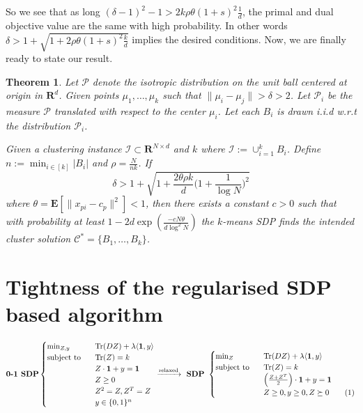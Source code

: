 \documentclass[12pt]{article}
\newcommand{\mc}{\mathcal}
\newcommand{\mb}{\mathbf}
\newcommand{\tr}{\text{Tr}}
\newcommand\numberthis{\addtocounter{equation}{1}\tag{\theequation}}
\newtheorem{theorem}{Theorem}
\begin{document}
So we see that as long $(\delta - 1)^2 - 1 > 2k\rho\theta (1+s)^2\frac{1}{d}$, the primal and dual objective value are the same with high probability. In other words $\delta > 1 + \sqrt{1+2\rho\theta(1+s)^2\frac{k}{d}}$ implies the desired conditions. Now, we are finally ready to state our result.

\begin{theorem}
\label{a-thm:SDPIsometric}
Let $\mc P$ denote the isotropic distribution on the unit ball centered at origin in $\mb R^d$. Given points $\mu_1, \ldots, \mu_k$ such that $\|\mu_i - \mu_j\| > \delta  > 2$. Let $\mc P_i$ be the measure $\mc P$ translated with respect to the center $\mu_i$. Let each $B_i$ is drawn i.i.d w.r.t the distribution $\mc P_i$. 

Given a clustering instance $\mc I \subset \mb R^{N\times d}$ and $k$ where $\mc I := \cup_{i=1}^k B_i$. Define $ n := \min_{i\in[k]} |B_i|$ and $\rho = \frac{N}{nk}$. If
$$\delta > 1 + \sqrt{1+\frac{2\theta\rho k}{d}\Big(1+\frac{1}{\log N}\Big)^2}$$  
where $\theta = \mb E[\|x_{pi}-c_p\|^2] < 1$, then there exists a constant $c > 0$ such that with probability at least $1 - 2d\exp(\frac{-cN\theta}{d\log^2N})$ the $k$-means SDP finds the intended cluster solution  $\mc C^* = \{B_1, \ldots, B_k\}$.
\end{theorem}

\section{Tightness of the regularised SDP based algorithm}
\begin{equation*}
	\textbf{0-1 SDP} 
	\begin{cases}
		\min_{Z, y} \enspace &\tr(DZ) + \lambda \langle \mb 1, y\rangle\\
		\text{subject to } \enspace &\tr(Z) = k\\
		& Z\cdot \mb 1 + y = \mb 1\\	
		&Z\ge 0\\
		&Z^2 = Z, Z^T = Z \\
		& y \in \{0, 1\}^n
	\end{cases}
	\xrightarrow{\text{relaxed}} \textbf{ SDP } 
	\begin{cases}
		\min_{Z} \enspace &\tr(DZ) + \lambda \langle \mb 1, y\rangle\\
        \text{subject to } \enspace &\tr(Z) = k\\
		& \Big(\frac{Z+Z^T}{2}\Big)\cdot \mb 1 + y = \mb 1\\		
		&Z \ge 0, y \ge 0, Z \succeq 0 \numberthis\label{a-eqn:regularisedSDP}
	\end{cases}
\end{equation*}
\end{document}
